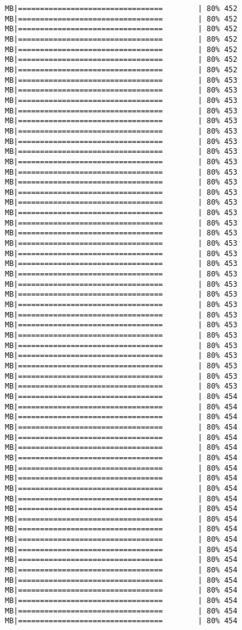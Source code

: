 \documentclass[
]{article}
\begin{document}
\begin{verbatim}
MB|=================================        | 80% 452 MB|=================================        | 80% 452 MB|=================================        | 80% 452 MB|=================================        | 80% 452 MB|=================================        | 80% 452 MB|=================================        | 80% 452 MB|=================================        | 80% 452 MB|=================================        | 80% 453 MB|=================================        | 80% 453 MB|=================================        | 80% 453 MB|=================================        | 80% 453 MB|=================================        | 80% 453 MB|=================================        | 80% 453 MB|=================================        | 80% 453 MB|=================================        | 80% 453 MB|=================================        | 80% 453 MB|=================================        | 80% 453 MB|=================================        | 80% 453 MB|=================================        | 80% 453 MB|=================================        | 80% 453 MB|=================================        | 80% 453 MB|=================================        | 80% 453 MB|=================================        | 80% 453 MB|=================================        | 80% 453 MB|=================================        | 80% 453 MB|=================================        | 80% 453 MB|=================================        | 80% 453 MB|=================================        | 80% 453 MB|=================================        | 80% 453 MB|=================================        | 80% 453 MB|=================================        | 80% 453 MB|=================================        | 80% 453 MB|=================================        | 80% 453 MB|=================================        | 80% 453 MB|=================================        | 80% 453 MB|=================================        | 80% 453 MB|=================================        | 80% 453 MB|=================================        | 80% 453 MB|=================================        | 80% 454 MB|=================================        | 80% 454 MB|=================================        | 80% 454 MB|=================================        | 80% 454 MB|=================================        | 80% 454 MB|=================================        | 80% 454 MB|=================================        | 80% 454 MB|=================================        | 80% 454 MB|=================================        | 80% 454 MB|=================================        | 80% 454 MB|=================================        | 80% 454 MB|=================================        | 80% 454 MB|=================================        | 80% 454 MB|=================================        | 80% 454 MB|=================================        | 80% 454 MB|=================================        | 80% 454 MB|=================================        | 80% 454 MB|=================================        | 80% 454 MB|=================================        | 80% 454 MB|=================================        | 80% 454 MB|=================================        | 80% 454 MB|=================================        | 80% 454 MB|=================================        | 80% 454 
\end{verbatim}
\end{document}
